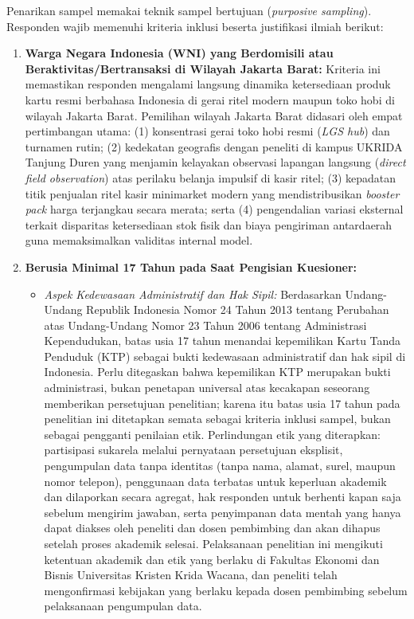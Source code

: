 \documentclass[12pt,a4paper]{article}
\numberwithin{equation}{section}
\numberwithin{table}{section}
\numberwithin{figure}{section}
\begin{document}
Penarikan sampel memakai teknik sampel bertujuan (\emph{purposive sampling}). Responden wajib memenuhi kriteria inklusi beserta justifikasi ilmiah berikut:
\begin{enumerate}
  \item \textbf{Warga Negara Indonesia (WNI) yang Berdomisili atau Beraktivitas/Bertransaksi di Wilayah Jakarta Barat:} Kriteria ini memastikan responden mengalami langsung dinamika ketersediaan produk kartu resmi berbahasa Indonesia di gerai ritel modern maupun toko hobi di wilayah Jakarta Barat. Pemilihan wilayah Jakarta Barat didasari oleh empat pertimbangan utama: (1) konsentrasi gerai toko hobi resmi (\emph{LGS hub}) dan turnamen rutin; (2) kedekatan geografis dengan peneliti di kampus UKRIDA Tanjung Duren yang menjamin kelayakan observasi lapangan langsung (\emph{direct field observation}) atas perilaku belanja impulsif di kasir ritel; (3) kepadatan titik penjualan ritel kasir minimarket modern yang mendistribusikan \emph{booster pack} harga terjangkau secara merata; serta (4) pengendalian variasi eksternal terkait disparitas ketersediaan stok fisik dan biaya pengiriman antardaerah guna memaksimalkan validitas internal model.
  \item \textbf{Berusia Minimal 17 Tahun pada Saat Pengisian Kuesioner:} 
  \begin{itemize}
    \item \emph{Aspek Kedewasaan Administratif dan Hak Sipil:} Berdasarkan Undang-Undang Republik Indonesia Nomor 24 Tahun 2013 tentang Perubahan atas Undang-Undang Nomor 23 Tahun 2006 tentang Administrasi Kependudukan, batas usia 17 tahun menandai kepemilikan Kartu Tanda Penduduk (KTP) sebagai bukti kedewasaan administratif dan hak sipil di Indonesia. Perlu ditegaskan bahwa kepemilikan KTP merupakan bukti administrasi, bukan penetapan universal atas kecakapan seseorang memberikan persetujuan penelitian; karena itu batas usia 17 tahun pada penelitian ini ditetapkan semata sebagai kriteria inklusi sampel, bukan sebagai pengganti penilaian etik. Perlindungan etik yang diterapkan: partisipasi sukarela melalui pernyataan persetujuan eksplisit, pengumpulan data tanpa identitas (tanpa nama, alamat, surel, maupun nomor telepon), penggunaan data terbatas untuk keperluan akademik dan dilaporkan secara agregat, hak responden untuk berhenti kapan saja sebelum mengirim jawaban, serta penyimpanan data mentah yang hanya dapat diakses oleh peneliti dan dosen pembimbing dan akan dihapus setelah proses akademik selesai. Pelaksanaan penelitian ini mengikuti ketentuan akademik dan etik yang berlaku di Fakultas Ekonomi dan Bisnis Universitas Kristen Krida Wacana, dan peneliti telah mengonfirmasi kebijakan yang berlaku kepada dosen pembimbing sebelum pelaksanaan pengumpulan data.

\end{itemize}
\end{enumerate}
\end{document}
